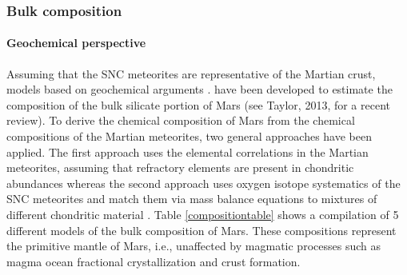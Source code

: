 \subsubsection{Bulk composition}
\setcounter{tocdepth}{4} \setcounter{secnumdepth}{4}
\paragraph{Geochemical perspective}

Assuming that the SNC meteorites are representative of the Martian crust, models based on geochemical arguments \cite{Dreibus1984}\cite{Dreibus1984AccretionPlanets.,Dreibus&Wanke1985, Wanke1994, Lodders1997, Morgan1979, Sanloup1999}. \cite{Mohapatra&Murty2003} have been developed to estimate the composition of the bulk silicate portion of Mars (see Taylor, 2013, for a recent review). To derive the chemical composition of Mars from the chemical compositions of the Martian meteorites, two general approaches have been applied. The first approach uses the elemental correlations in the Martian meteorites, assuming that refractory elements are present in chondritic abundances \cite{Dreibus1984, Dreibus1984AccretionPlanets.,Dreibus&Wanke1985, Wanke1994, Halliday2001, Longhi1992, Taylor2013} whereas the second approach uses oxygen isotope systematics of the SNC meteorites and match them via mass balance equations to mixtures of different chondritic material \citep{Lodders1997,Sanloup1999, Burbine2004}. Table \ref{compositiontable} shows a compilation of 5 different models of the bulk composition of Mars. These compositions represent the primitive mantle of Mars, i.e., unaffected by magmatic processes such as magma ocean fractional crystallization and crust formation. 

